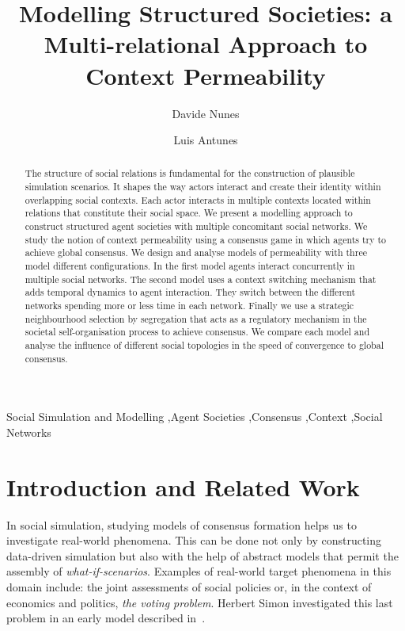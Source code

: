 \documentclass[preprint,number]{elsarticle}
\begin{document}
\begin{frontmatter}

\author[ul]{Davide Nunes}
\author[ul]{Luis Antunes}




\address[ul]{Group of Studies in Social Simulation (GUESS), Laboratory of Agent Modelling, University of Lisbon, 1749-016 Lisbon, Portugal}
\title{Modelling Structured Societies: a Multi-relational Approach to Context Permeability}

\begin{abstract}
The structure of social relations is fundamental for the construction of plausible simulation scenarios. It shapes the way actors interact and create their identity within overlapping social contexts. Each actor interacts in multiple contexts located within relations that constitute their social space. We present a modelling approach to construct structured agent societies with multiple concomitant social networks. We study the notion of context permeability using a consensus game in which agents try to achieve global consensus. We design and analyse models of permeability with three model different configurations. In the first model agents interact concurrently in multiple social networks. The second model uses a context switching mechanism that adds temporal dynamics to agent interaction. They switch between the different networks spending more or less time in each network. Finally we use a strategic neighbourhood selection by segregation that acts as a regulatory mechanism in the societal self-organisation process to achieve consensus. We compare each model and analyse the influence of different social topologies in the speed of convergence to global consensus.
\end{abstract}

\begin{keyword}
Social Simulation and Modelling \sep Agent Societies \sep Consensus \sep Context \sep Social Networks
\end{keyword}

\end{frontmatter}
\newpage
\section{Introduction and Related Work}
\label{sec:introduction}
\noindent In social simulation, studying models of consensus formation helps us to investigate real-world phenomena. This can be done not only by constructing data-driven simulation but also with the help of abstract models that permit the assembly of \textit{what-if-scenarios}. Examples of real-world target phenomena in this domain include: the joint assessments of social policies or, in the context of economics and politics, \textit{the voting problem}. Herbert Simon investigated this last problem in an early model described in~\cite{Simon1954}.
\end{document}
